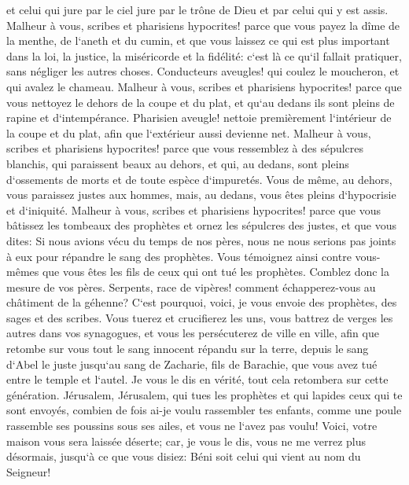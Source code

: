 \verse et celui qui jure par le ciel jure par le trône de Dieu et par celui qui y est assis. 
\verse Malheur à vous, scribes et pharisiens hypocrites! parce que vous payez la dîme de la menthe, de l`aneth et du cumin, et que vous laissez ce qui est plus important dans la loi, la justice, la miséricorde et la fidélité: c`est là ce qu`il fallait pratiquer, sans négliger les autres choses. 
\verse Conducteurs aveugles! qui coulez le moucheron, et qui avalez le chameau. 
\verse Malheur à vous, scribes et pharisiens hypocrites! parce que vous nettoyez le dehors de la coupe et du plat, et qu`au dedans ils sont pleins de rapine et d`intempérance. 
\verse Pharisien aveugle! nettoie premièrement l`intérieur de la coupe et du plat, afin que l`extérieur aussi devienne net. 
\verse Malheur à vous, scribes et pharisiens hypocrites! parce que vous ressemblez à des sépulcres blanchis, qui paraissent beaux au dehors, et qui, au dedans, sont pleins d`ossements de morts et de toute espèce d`impuretés. 
\verse Vous de même, au dehors, vous paraissez justes aux hommes, mais, au dedans, vous êtes pleins d`hypocrisie et d`iniquité. 
\verse Malheur à vous, scribes et pharisiens hypocrites! parce que vous bâtissez les tombeaux des prophètes et ornez les sépulcres des justes, 
\verse et que vous dites: Si nous avions vécu du temps de nos pères, nous ne nous serions pas joints à eux pour répandre le sang des prophètes. 
\verse Vous témoignez ainsi contre vous-mêmes que vous êtes les fils de ceux qui ont tué les prophètes. 
\verse Comblez donc la mesure de vos pères. 
\verse Serpents, race de vipères! comment échapperez-vous au châtiment de la géhenne? 
\verse C`est pourquoi, voici, je vous envoie des prophètes, des sages et des scribes. Vous tuerez et crucifierez les uns, vous battrez de verges les autres dans vos synagogues, et vous les persécuterez de ville en ville, 
\verse afin que retombe sur vous tout le sang innocent répandu sur la terre, depuis le sang d`Abel le juste jusqu`au sang de Zacharie, fils de Barachie, que vous avez tué entre le temple et l`autel. 
\verse Je vous le dis en vérité, tout cela retombera sur cette génération. 
\verse Jérusalem, Jérusalem, qui tues les prophètes et qui lapides ceux qui te sont envoyés, combien de fois ai-je voulu rassembler tes enfants, comme une poule rassemble ses poussins sous ses ailes, et vous ne l`avez pas voulu! 
\verse Voici, votre maison vous sera laissée déserte; 
\verse car, je vous le dis, vous ne me verrez plus désormais, jusqu`à ce que vous disiez: Béni soit celui qui vient au nom du Seigneur! 

